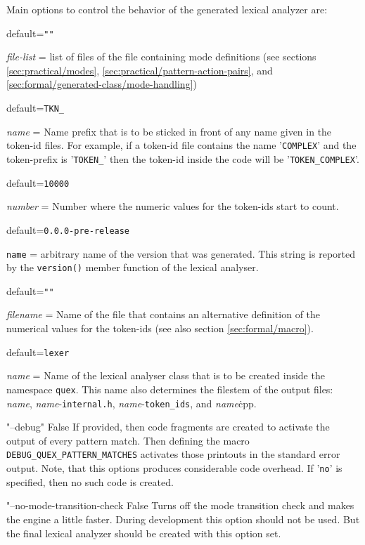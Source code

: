 \newcommand\clopt[4]{
    \item[\tt #1 {\it #2\/}:] \hfill default={\tt #3}

    #4
}

Main options to control the behavior of the generated lexical analyzer are:

\begin{description}

    \clopt{"-i", "--mode-files"} {file-list} {""}
        {
	    {\it file-list} = list of files of the file containing mode definitions
	    (see sections \ref{sec:practical/modes},
	     \ref{sec:practical/pattern-action-pairs}, and
	     \ref{sec:formal/generated-class/mode-handling})
	}

    \clopt{"--token-prefix"} {name} {TKN\_}
	{
	    {\it name} = Name prefix that is to be sticked in front of any name
	    given in the token-id files. For example, if a token-id file contains
	    the name '{\tt COMPLEX}' and the token-prefix is '{\tt TOKEN\_}'
	    then the token-id inside the code will be '{\tt TOKEN\_COMPLEX}'.
	}

    \clopt{"--token-offset"} {number} {10000}
        {
	    {\it number} = Number where the numeric values for the token-ids start
	    to count.
	}

    \clopt{"--version-id"} {name} {0.0.0-pre-release}
        { 
	    {\tt name} = arbitrary name of the version that was generated. This string
	    is reported by the {\tt version()} member function of the lexical analyser.
	}

    \clopt{"--foreign-token-id-file"} {filename} {""}
        {
	    {\it filename} = Name of the file that contains an alternative definition
	    of the numerical values for the token-ids (see also section
	    \ref{sec:formal/macro}).
	}

    \clopt{"-o", "--engine"}{name}{lexer}    
        {
	    {\it name} = Name of the lexical analyser class that is to be created
	    inside the namespace {\tt quex}. This name also determines the
		filestem of the output files: {\it name}, {\it name}-{\tt internal.h}, 
	    {\it name}-{\tt token\_ids}, and {\it name}{\.cpp}.
        }

    \item{"--debug"} {} {False}
        { 
	    If provided, then code fragments are created to
	    activate the output of every pattern match. Then defining the macro {\tt
	    DEBUG\_QUEX\_PATTERN\_MATCHES} activates those printouts in the
	    standard error output. Note, that this options produces considerable
	    code overhead. If '{\tt no}' is specified, then no such code is created.
        }       
   \item{"--no-mode-transition-check} {} {False}
        {
	    Turns off the mode transition check and makes the engine a little faster.
	    During development this option should not be used. But the final lexical
	    analyzer should be created with this option set.
	}
\end{description}

